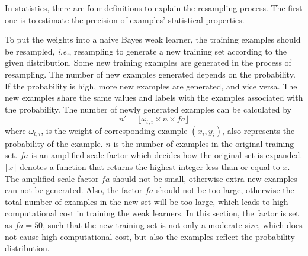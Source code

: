 
In statistics, there are four definitions to explain the resampling process. The first one is to estimate the precision of examples' statistical properties. 

To put the weights into a naive Bayes weak learner, the training examples should be resampled, \textit{i.e.}, resampling to generate a new training set according to the given distribution. Some new training examples are generated in the process of resampling. The number of new examples generated depends on the probability. If the probability is high, more new examples are generated, and vice versa. The new examples share the same values and labels with the examples associated with the probability.  The number of newly generated examples can be calculated by
\begin{equation}\label{eq:newnumofexamples}
 n' = \lfloor \omega_{t,i} \times n \times fa \rfloor
\end{equation}
where $\omega_{t,i}$, is the weight of corresponding example $(x_{i},y_{i})$, also represents the probability of the example. $n$ is the number of examples in the original training set. $fa$ is an amplified scale factor which decides how the original set is expanded. $\lfloor x \rfloor$ denotes a function that returns the highest integer less than or equal to $x$. The amplified scale factor $fa$ should not be small, otherwise extra new examples can not be generated. Also, the factor $fa$ should not be too large, otherwise the total number of examples in the new set will be too large, which leads to high computational cost in training the weak learners. In this section, the factor is set as $fa =50$, such that the new training set is not only a moderate size, which does not cause high computational cost, but also the examples reflect the probability distribution.

